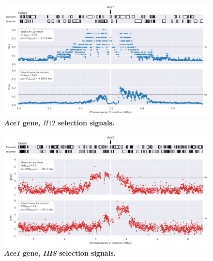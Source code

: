 \documentclass[a4paper,11pt,abstracton,hidelinks]{scrartcl}
\begin{document}
\begin{figure}[t!]
	\begin{center}
		\includegraphics*[width=1\linewidth,center]{artwork/locus_ace1_h12_pdist.png}
	\end{center}
	\caption[\textit{Ace1} gene, $H12$ selection signals]{
	\textbf{\textit{Ace1} gene, $H12$ selection signals.}
	} 
	\label{fig:locus_ace1_h12}
\end{figure}


\clearpage


\begin{figure}[t!]
	\begin{center}
		\includegraphics*[width=1\linewidth,center]{artwork/locus_ace1_ihs_pdist.png}
	\end{center}
	\caption[\textit{Ace1} gene, \textit{IHS} selection signals]{
	\textbf{\textit{Ace1} gene, \textit{IHS} selection signals.}
	} 
	\label{fig:locus_ace1_ihs}
\end{figure}


\clearpage
\end{document}
